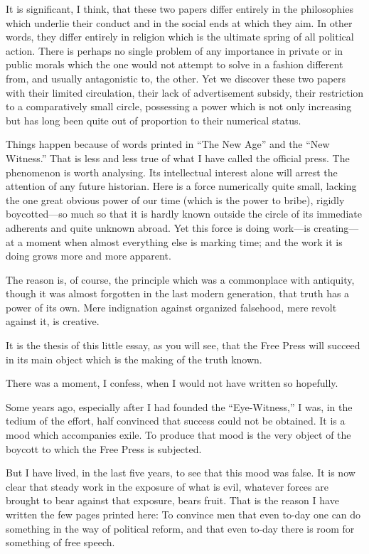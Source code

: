\documentclass{book}
\begin{document}
It is significant, I think, that these two papers differ entirely in the philosophies which underlie their conduct and in the social ends at which they aim. In other words, they differ entirely in religion which is the ultimate spring of all political action. There is perhaps no single problem of any importance in private or in public morals which the one would not attempt to solve in a fashion different from, and usually antagonistic to, the other. Yet we discover these two papers with their limited circulation, their lack of advertisement subsidy, their restriction to a comparatively small circle, possessing a power which is not only increasing but has long been quite out of proportion to their numerical status.

Things happen because of words printed in “The New Age” and the “New Witness.” That is less and less true of what I have called the official press. The phenomenon is worth analysing. Its intellectual interest alone will arrest the attention of any future historian. Here is a force numerically quite small, lacking the one great obvious power of our time (which is the power to bribe), rigidly boycotted—so much so that it is hardly known outside the circle of its immediate adherents and quite unknown abroad. Yet this force is doing work—is creating—at a moment when almost everything else is marking time; and the work it is doing grows more and more apparent.

The reason is, of course, the principle which was a commonplace with antiquity, though it was almost forgotten in the last modern generation, that truth has a power of its own. Mere indignation against organized falsehood, mere revolt against it, is creative.

It is the thesis of this little essay, as you will see, that the Free Press will succeed in its main object which is the making of the truth known.

There was a moment, I confess, when I would not have written so hopefully.

Some years ago, especially after I had founded the “Eye-Witness,” I was, in the tedium of the effort, half convinced that success could not be obtained. It is a mood which accompanies exile. To produce that mood is the very object of the boycott to which the Free Press is subjected.

But I have lived, in the last five years, to see that this mood was false. It is now clear that steady work in the exposure of what is evil, whatever forces are brought to bear against that exposure, bears fruit. That is the reason I have written the few pages printed here: To convince men that even to-day one can do something in the way of political reform, and that even to-day there is room for something of free speech.
\end{document}
